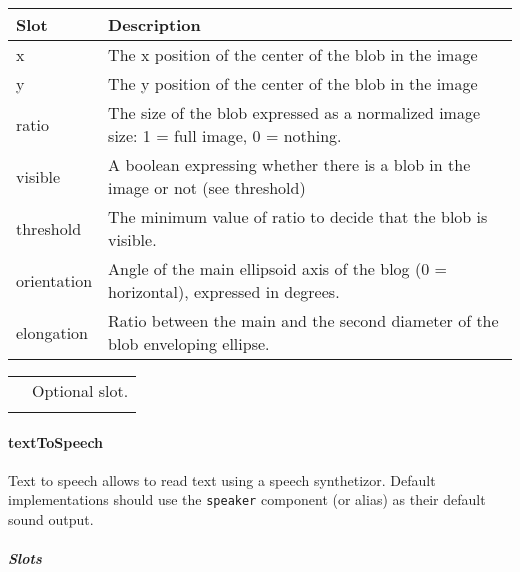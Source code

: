 \documentclass[a4paper]{article}
\begin{document}
\begin{flushleft}
\tablehead{}
\begin{supertabular}{|m{3.293cm}|m{11.997cm}|}
\hline
\sffamily\bfseries Slot &
\sffamily\bfseries Description\\\hline
x &
\sffamily The x position of the center of the
blob in the image\\\hline
y &
\sffamily The y position of the center of the
blob in the image\\\hline
ratio &
\sffamily The size of the blob expressed as a
normalized image size: 1 = full image, 0 = nothing.\\\hline
visible &
\textsf{A boolean expressing whether there is a
blob in the image or not (see }threshold\textsf{)}\\\hline
threshold &
\textsf{The minimum value of }ratio\textsf{ to
decide that the blob is }visible\textsf{.}\\\hline
orientation &
\sffamily Angle of the main ellipsoid axis of
the blog (0 = horizontal), expressed in degrees.\\\hline
elongation &
\sffamily Ratio between the main and the second
diameter of the blob enveloping ellipse.\\\hline
\end{supertabular}
\end{flushleft}
\begin{flushleft}
\tablehead{}
\begin{supertabular}{|m{1.717cm}|m{10.464cm}}
\hhline{-~}
 &
\sffamily Optional slot.\\\hhline{-~}
\end{supertabular}
\end{flushleft}
\paragraph{textToSpeech}


Text to speech allows to read text using a speech synthetizor. Default
implementations should use the \texttt{speaker} component (or alias) as
their default sound output.

\subparagraph{Slots}
\end{document}
